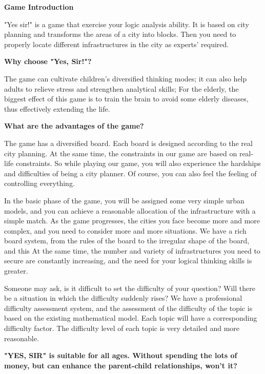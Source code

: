 \documentclass{mcmthesis}
\begin{document}
		\textbf{Game Introduction}
		
		"Yes sir!" is a game that exercise your logic analysis ability. It is based on city planning and transforms the areas of a city into blocks. Then you need to properly locate different infrastructures in the city as experts' required.
		
		\textbf{Why choose "Yes, Sir!"?}
		
		The game can cultivate children's diversified thinking modes; it can also help adults to relieve stress and strengthen analytical skills; For the elderly, the biggest effect of this game is to train the brain to avoid some elderly diseases, thus effectively extending the life. 
		
		\textbf{What are the advantages of the game?}
		
		The game has a diversified board. Each board is designed according to the real city planning. At the same time, the constraints in our game are based on real-life constraints. So while playing our game, you will also experience the hardships and difficulties of being a city planner. Of course, you can also feel the feeling of controlling everything.
		
		In the basic phase of the game, you will be assigned some very simple urban models, and you can achieve a reasonable allocation of the infrastructure with a simple match. As the game progresses, the cities you face become more and more complex, and you need to consider more and more situations. We have a rich board system, from the rules of the board to the irregular shape of the board, and this At the same time, the number and variety of infrastructures you need to secure are constantly increasing, and the need for your logical thinking skills is greater.
		
		Someone may ask, is it difficult to set the difficulty of your question? Will there be a situation in which the difficulty suddenly rises? We have a professional difficulty assessment system, and the assessment of the difficulty of the topic is based on the existing mathematical model. Each topic will have a corresponding difficulty factor. The difficulty level of each topic is very detailed and more reasonable.
		
		\textbf{"YES, SIR" is suitable for all ages. Without spending the lots of money, but can enhance the parent-child relationships, won't it?}
\end{document}
